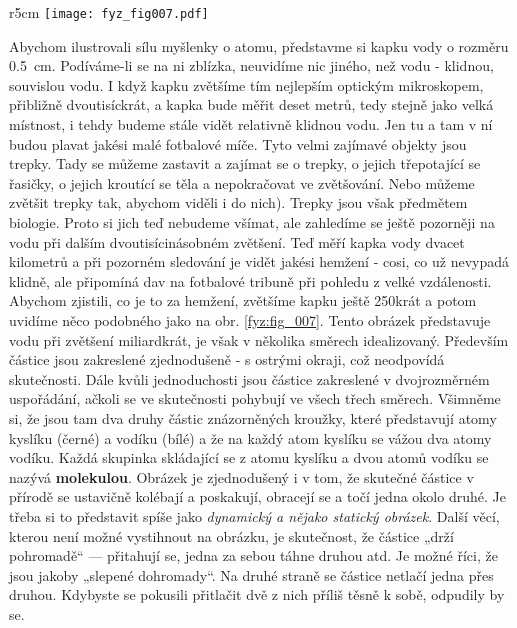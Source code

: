 {      \begin{wrapfigure}[13]{r}{5cm}
        \centering
        \texttt{[image: fyz\_fig007.pdf]}
        \caption{Voda zvětšená miliardkrát \cite[s.~17]{Feynman01}}
        \label{fyz:fig_007}
      \end{wrapfigure} 
      Abychom ilustrovali sílu myšlenky o atomu, představme si kapku vody o rozměru \SI{0.5}{\cm}. 
      Podí\-váme-li se na ni zblízka, neuvidíme nic jiného, než vodu - klidnou, souvislou vodu. I 
      když kapku zvětšíme tím nejlepším optickým mikroskopem, přibližně dvoutisíckrát, a kapka bude 
      měřit deset metrů, tedy stejně jako velká místnost, i tehdy budeme stále vidět relativně 
      klidnou vodu. Jen tu a tam v ní budou plavat jakési malé fotbalové míče. Tyto velmi zajímavé 
      objekty jsou trepky. Tady se můžeme zastavit a zajímat se o trepky, o jejich třepotající se 
      řasičky, o jejich kroutící se těla a nepokračovat ve zvětšování. Nebo můžeme zvětšit trepky 
      tak, abychom viděli i do nich). Trepky jsou však předmětem biologie. Proto si jich teď 
      nebudeme všímat, ale zahledíme se ještě pozorněji na vodu při dalším dvoutisícinásobném 
      zvětšení. Teď měří kapka vody dvacet kilometrů a při pozorném sledování je vidět jakési 
      hemžení - cosi, co už nevypadá klidně, ale připomíná dav na fotbalové tribuně při pohledu z 
      velké vzdálenosti. Abychom zjistili, co je to za hemžení, zvětšíme kapku ještě 250krát a 
      potom uvidíme něco podobného jako na obr. \ref{fyz:fig_007}. Tento obrázek představuje vodu 
      při zvětšení miliardkrát, je však v několika směrech idealizovaný. Především částice jsou 
      zakreslené zjednodušeně - s ostrými okraji, což neodpovídá skutečnosti. Dále kvůli 
      jednoduchosti jsou částice zakreslené v dvojrozměrném uspořádání, ačkoli se ve skutečnosti 
      pohybují ve všech třech směrech. Všimněme si, že jsou tam dva druhy částic znázorněných 
      kroužky, které představují atomy kyslíku (černé) a vodíku (bílé) a že na každý atom kyslíku 
      se vážou dva atomy vodíku. Každá skupinka skládající se z atomu kyslíku a dvou atomů vodíku 
      se nazývá \textbf{molekulou}. Obrázek je zjednodušený i v tom, že skutečné částice v přírodě 
      se ustavičně kolébají a poskakují, obracejí se a točí jedna okolo druhé. Je třeba si to 
      představit spíše jako \emph{dynamický a nějako statický obrázek}. Další věcí, kterou není 
      možné vystihnout na obrázku, je skutečnost, že částice „drží pohromadě“ — přitahují se, jedna 
      za sebou táhne druhou atd. Je možné říci, že jsou jakoby „slepené dohromady“. Na druhé straně 
      se částice netlačí jedna přes druhou. Kdybyste se pokusili přitlačit dvě z nich příliš těsně 
      k sobě, odpudily by se.

}

